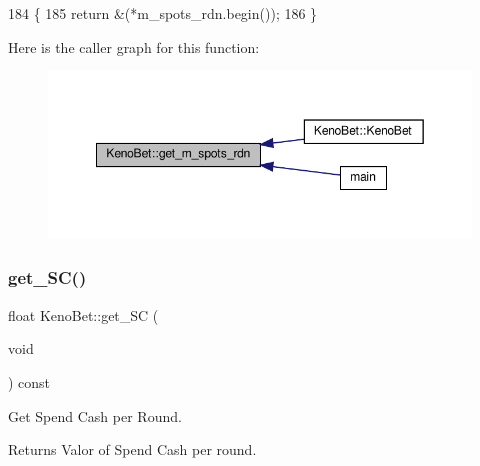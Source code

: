 \begin{DoxyCode}
184 \{
185     \textcolor{keywordflow}{return} &(*m\_spots\_rdn.begin());
186 \}
\end{DoxyCode}
Here is the caller graph for this function\+:
\nopagebreak
\begin{figure}[H]
\begin{center}
\leavevmode
\includegraphics[width=349pt]{classKenoBet_a8106aa1f149ba3043a8219453e1af3a1_icgraph}
\end{center}
\end{figure}
\mbox{\label{classKenoBet_a0c2ee88fc2f8e7afc5b0399fe74c022b}} 
\subsubsection{\texorpdfstring{get\+\_\+\+S\+C()}{get\_SC()}}
{\footnotesize\ttfamily float Keno\+Bet\+::get\+\_\+\+SC (\begin{DoxyParamCaption}\item[{void}]{ }\end{DoxyParamCaption}) const}



Get Spend Cash per Round. 

\begin{DoxyReturn}{Returns}
Valor of Spend Cash per round. 
\end{DoxyReturn}

